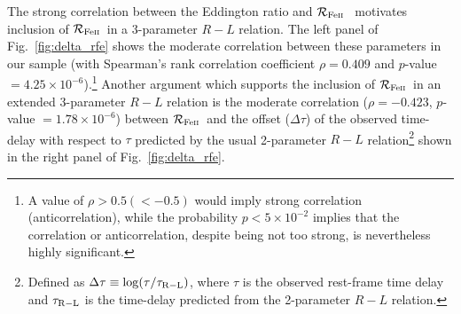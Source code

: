 \documentclass[a4paper,fleqn,usenatbib]{mnras}
\newcommand{\rfe}{${\cal R}_{\rm{Fe\textsc{ii}}}$}
\begin{document}
The strong correlation between the Eddington ratio and \rfe\ \citep{borosongreen1992, marziani2003} motivates inclusion of \rfe\ in a 3-parameter $R-L$ relation. The left panel of Fig.~\ref{fig:delta_rfe} shows the moderate correlation between these parameters in our sample (with Spearman's rank correlation coefficient $\rho=0.409$ and $p$-value $=4.25\times10^{-6}$).\footnote{A value of $\rho > 0.5 (< - 0.5)$ would imply strong correlation (anticorrelation), while the probability $p < 5\times 10^{-2}$ implies that the correlation or anticorrelation, despite being not too strong, is nevertheless highly significant.} Another argument which supports the inclusion of \rfe\ in an extended 3-parameter $R-L$ relation is the moderate correlation ($\rho=-0.423$, $p$-value $=1.78\times10^{-6}$) between \rfe\ and the offset ($\Delta \tau$) of the observed time-delay with respect to $\tau$ predicted by the usual 2-parameter $R-L$ relation\footnote{Defined as $\Delta \tau\equiv \log(\tau/\tau_{\rm R-L})$, where $\tau$ is the observed rest-frame time delay and $\tau_{\rm R-L}$ is the time-delay predicted from the 2-parameter $R-L$ relation.} \citep{2013ApJ...767..149B} shown in the right panel of Fig.~\ref{fig:delta_rfe}. 
\end{document}
